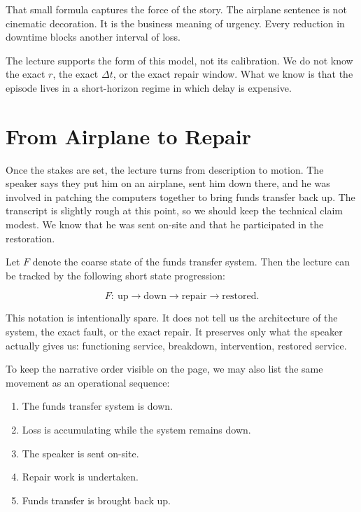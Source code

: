 That small formula captures the force of the story. The airplane sentence is not cinematic decoration. It is the business meaning of urgency. Every reduction in downtime blocks another interval of loss.

\begin{remark}
The lecture supports the form of this model, not its calibration. We do not know the exact \(r\), the exact \(\Delta t\), or the exact repair window. What we know is that the episode lives in a short-horizon regime in which delay is expensive.
\end{remark}

\section{From Airplane to Repair}

Once the stakes are set, the lecture turns from description to motion. The speaker says they put him on an airplane, sent him down there, and he was involved in patching the computers together to bring funds transfer back up. The transcript is slightly rough at this point, so we should keep the technical claim modest. We know that he was sent on-site and that he participated in the restoration.

Let \(F\) denote the coarse state of the funds transfer system. Then the lecture can be tracked by the following short state progression:

\begin{equation}
F:\ \text{up} \rightarrow \text{down} \rightarrow \text{repair} \rightarrow \text{restored}.
\end{equation}

This notation is intentionally spare. It does not tell us the architecture of the system, the exact fault, or the exact repair. It preserves only what the speaker actually gives us: functioning service, breakdown, intervention, restored service.

To keep the narrative order visible on the page, we may also list the same movement as an operational sequence:

\begin{enumerate}
\item The funds transfer system is down.
\item Loss is accumulating while the system remains down.
\item The speaker is sent on-site.
\item Repair work is undertaken.
\item Funds transfer is brought back up.
\end{enumerate}

